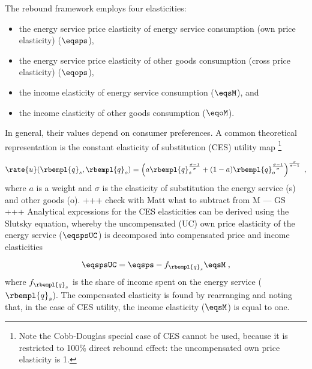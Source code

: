 

The rebound framework employs four elasticities:
%
\begin{itemize}

  \item the energy service price elasticity of energy service consumption (own price elasticity) ($\eqsps$),

  \item the energy service price elasticity of other goods consumption (cross price elasticity) ($\eqops$), 
  
  \item the income elasticity of energy service consumption ($\eqsM$), and 
  
  \item the income elasticity of other goods consumption ($\eqoM$).

\end{itemize}
%
In general, their values depend on consumer preferences.
A common theoretical representation is
the constant elasticity of substitution (CES)
utility map \citep{Lemoine:2020aa}%
\footnote{
  Note the Cobb-Douglas special case of CES cannot be used, because
  it is restricted to 100\% direct rebound effect: 
  the uncompensated own price elasticity is 1.
}

\begin{equation}
  \rate{u}(\rbempl{q}_s,\rbempl{q}_o) = 
      \left( a \rbempl{q}_s^{\frac{\sigma-1}{\sigma}} + (1-a) \rbempl{q}_o^{\frac{\sigma-1}{\sigma}}\right)                ^{\frac{\sigma}{\sigma-1}} \; ,
\end{equation}
%
where $a$ is a weight and $\sigma$ is the elasticity of substitution 
the energy service (s) and other goods (o). 
+++ check with Matt what to subtract from M --- GS +++
Analytical expressions for the CES elasticities can be derived using the Slutsky equation, 
whereby the uncompensated (UC) own price elasticity 
of the energy service ($\eqspsUC$) 
is decomposed into compensated price and income elasticities

\begin{equation}
  \eqspsUC = \eqsps - f_{\rbempl{q}_s} \eqsM \; ,
\end{equation}
%
where $f_{\rbempl{q}_s}$ is the share of income spent 
on the energy service ($\rbempl{q}_s$). 
The compensated elasticity is found by rearranging and noting that, 
in the case of CES utility, 
the income elasticity ($\eqsM$) is equal to one. 

